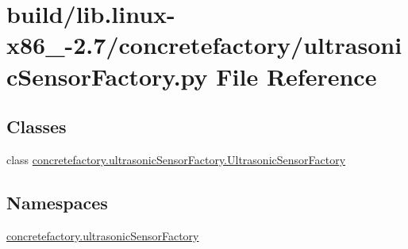 \hypertarget{build_2lib_8linux-x86__64-2_87_2concretefactory_2ultrasonicSensorFactory_8py}{}\section{build/lib.linux-\/x86\+\_-\/2.7/concretefactory/ultrasonic\+Sensor\+Factory.py File Reference}
\label{build_2lib_8linux-x86__64-2_87_2concretefactory_2ultrasonicSensorFactory_8py}
\subsection*{Classes}
\begin{DoxyCompactItemize}
\item 
class \hyperlink{classconcretefactory_1_1ultrasonicSensorFactory_1_1UltrasonicSensorFactory}{concretefactory.\+ultrasonic\+Sensor\+Factory.\+Ultrasonic\+Sensor\+Factory}
\end{DoxyCompactItemize}
\subsection*{Namespaces}
\begin{DoxyCompactItemize}
\item 
 \hyperlink{namespaceconcretefactory_1_1ultrasonicSensorFactory}{concretefactory.\+ultrasonic\+Sensor\+Factory}
\end{DoxyCompactItemize}

